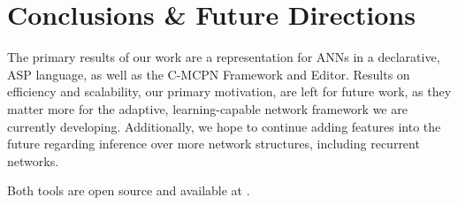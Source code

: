 \section{Conclusions \& Future Directions}

The primary results of our work are a representation for ANNs in a declarative, ASP language, as well as the C-MCPN Framework and Editor. Results on efficiency and scalability, our primary motivation, are left for future work, as they matter more for the adaptive, learning-capable network framework we are currently developing. Additionally, we hope to continue adding features into the future regarding inference over more network structures, including recurrent networks.

Both tools are open source and available at \cite{CMCPN2026}.






